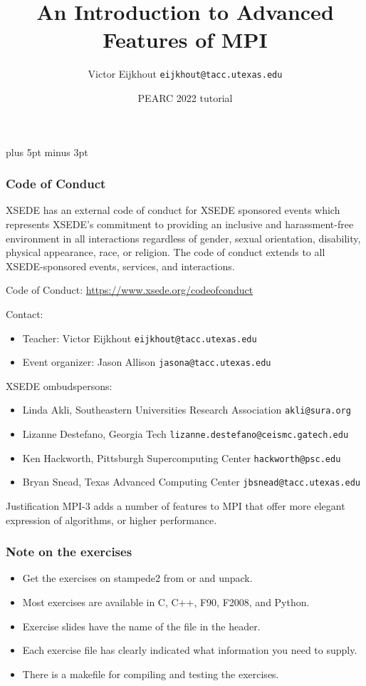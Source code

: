 \documentclass[11pt,headernav]{beamer}
\def\Location{}%
\def\Location{PEARC 2022 tutorial}
\begin{document}
\parskip=10pt plus 5pt minus 3pt

\title{An Introduction to Advanced Features of MPI}
\author{Victor Eijkhout {\tt eijkhout@tacc.utexas.edu}}
\date{\Location}

\begin{frame}
  \titlepage
\end{frame}

\begin{frame}\frametitle{Code of Conduct}
  \scriptsize
  XSEDE has an external code of conduct for XSEDE sponsored events
  which represents XSEDE's commitment to providing an inclusive and
  harassment-free environment in all interactions regardless of
  gender, sexual orientation, disability, physical appearance, race,
  or religion. The code of conduct extends to all XSEDE-sponsored
  events, services, and interactions.

  Code of Conduct: \url{https://www.xsede.org/codeofconduct}

  Contact:
  \begin{itemize}
  \item Teacher: Victor Eijkhout \texttt{eijkhout@tacc.utexas.edu}\\
  \item  Event organizer: Jason Allison  \texttt{jasona@tacc.utexas.edu}
  \end{itemize}
  XSEDE ombudspersons:
  \begin{itemize}
  \item
    Linda Akli, Southeastern Universities Research Association
    \texttt{akli@sura.org}
  \item 
    Lizanne Destefano, Georgia Tech
    \texttt{lizanne.destefano@ceismc.gatech.edu}
  \item 
    Ken Hackworth, Pittsburgh Supercomputing Center \texttt{hackworth@psc.edu}
  \item 
    Bryan Snead, Texas Advanced Computing Center
    \texttt{jbsnead@tacc.utexas.edu}
  \end{itemize}
\end{frame}

\begin{frame}{Justification}
  MPI-3 adds a number of features to MPI that offer more elegant
  expression of algorithms, or higher performance.
\end{frame}

\begin{frame}[containsverbatim]\frametitle{Note on the exercises}
  \begin{itemize}
  \item Get the exercises on stampede2 from
     or  and unpack.
  \item Most exercises are available in C, C++, F90, F2008, and Python.
  \item Exercise slides have the name of the file in the header.
  \item Each exercise file has clearly indicated what information you
    need to supply.
  \item There is a makefile for compiling and testing the exercises.
  \end{itemize}
\end{frame}
\end{document}

